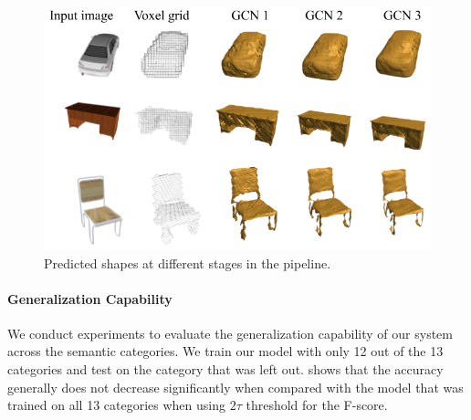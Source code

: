 \begin{figure}[th!]
    \begin{center}
        \includegraphics[width=\linewidth]{imgs/gcn_stages.png}
    \end{center}
        \caption{Predicted shapes at different stages in the pipeline.}
        \label{fig:gcn_stages}
\end{figure}

\vspace{-2mm}
\paragraph{Generalization Capability}
We conduct experiments to evaluate the generalization capability of our system across the semantic categories. We train our model with only 12 out of the 13 categories and test on the category that was left out.  shows that the accuracy generally does not decrease significantly when compared with the model that was trained on all 13 categories when using $2\tau$ threshold for the F-score.

